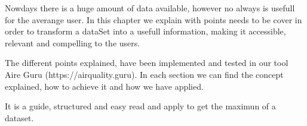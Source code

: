 
Nowdays there is a huge amount of data available, however no always is usefull for the averange user. In this
chapter we explain with points needs to be cover in order to transform a dataSet into a usefull information,
making it accessible, relevant and compelling to the users.

The different points explained, have been implemented and tested in our tool Aire Guru (https://airquality.guru).
In each section we can find the concept explained, how to achieve it and how we have applied.

It is a guide, structured and easy read and apply to get the maximun of a dataset.

